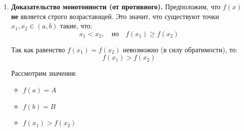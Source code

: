 \begin{tcolorbox}[title=Доказательство]
\begin{enumerate}
\begin{center}
\end{center}

        Предположим, что $\exists y_0 = f(x_0)$ такой, что $y_0 \notin [A, B]$.
        Например, $y_0 < A$.
        Тогда имеем: $f(x_0) < f(a) < f(b)$.
        По теореме о промежуточном значении на отрезке $[x_0, b]$ функция должна принять значение $f(a)$ (так как оно лежит между $f(x_0)$ и $f(b)$).
        То есть $\exists c \in (x_0, b): f(c) = f(a)$.
        Но $c \neq a$, так как $c > x_0 \ge a$.
        Получили $f(c) = f(a)$, что противоречит однозначной обратимости.
        \textbf{Вывод:} $f([a, b]) = [A, B]$.

        \item \textbf{Доказательство монотонности (от противного).}
        Предположим, что $f(x)$ \textbf{не} является строго возрастающей.
        Это значит, что существуют точки $x_1, x_2 \in (a, b)$ такие, что:
        \[ x_1 < x_2, \quad \text{но} \quad f(x_1) \ge f(x_2) \]
        
        Так как равенство $f(x_1) = f(x_2)$ невозможно (в силу обратимости), то:
        \[ f(x_1) > f(x_2) \]
        
        Рассмотрим значения:
        \begin{itemize}
            \item $f(a) = A$
            \item $f(b) = B$
            \item $f(x_1) > f(x_2)$
        \end{itemize}
        

\end{enumerate}
\end{tcolorbox}
